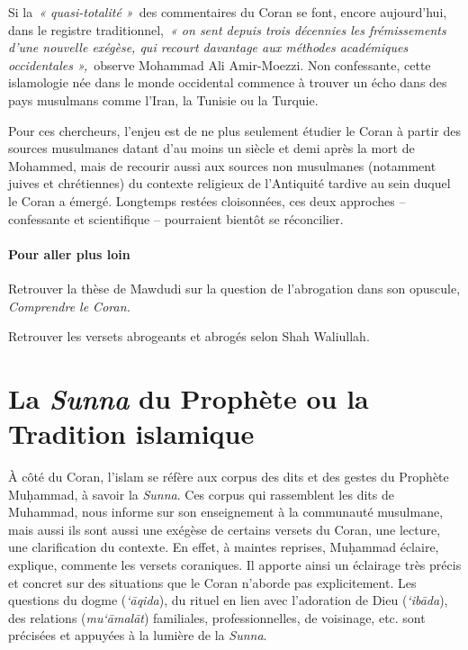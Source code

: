 Si la~\emph{« quasi-totalité »}~des commentaires du Coran se font,
encore aujourd'hui, dans le registre traditionnel,~\emph{« on sent
depuis trois décennies les frémissements d'une nouvelle exégèse, qui
recourt davantage aux méthodes académiques occidentales »,~}observe
Mohammad Ali Amir-Moezzi. Non confessante, cette islamologie née dans le
monde occidental commence à trouver un écho dans des pays musulmans
comme l'Iran, la Tunisie ou la Turquie.

 

Pour ces chercheurs, l'enjeu est de ne plus seulement étudier le Coran à
partir des sources musulmanes datant d'au moins un siècle et demi après
la mort de Mohammed, mais de recourir aussi aux sources non musulmanes
(notamment juives et chrétiennes) du contexte religieux de l'Antiquité
tardive au sein duquel le Coran a émergé. Longtemps restées cloisonnées,
ces deux approches -- confessante et scientifique -- pourraient bientôt
se réconcilier.




\subsubsection{Pour aller plus loin}

Retrouver la thèse de Mawdudi sur la question de l'abrogation dans son
opuscule, \emph{Comprendre le Coran.}

Retrouver les versets abrogeants et abrogés selon Shah Waliullah.




\chapter{La \emph{Sunna} du Prophète ou la Tradition islamique}

À côté du Coran, l'islam se réfère aux corpus des dits et des gestes du
Prophète Muḥammad, à savoir la \emph{Sunna}. Ces corpus qui rassemblent
les dits de Muhammad, nous informe sur son enseignement à la communauté
musulmane, mais aussi ils sont aussi une exégèse de certains versets du
Coran, une lecture, une clarification du contexte. En effet, à maintes
reprises, Muḥammad éclaire, explique, commente les versets coraniques.
Il apporte ainsi un éclairage très précis et concret sur des situations
que le Coran n'aborde pas explicitement. Les questions du dogme
(\emph{`āqida}), du rituel en lien avec l'adoration de Dieu
(\emph{`ibāda}), des relations (\emph{mu`āmalāt}) familiales,
professionnelles, de voisinage, etc. sont précisées et appuyées à la
lumière de la \emph{Sunna}.

